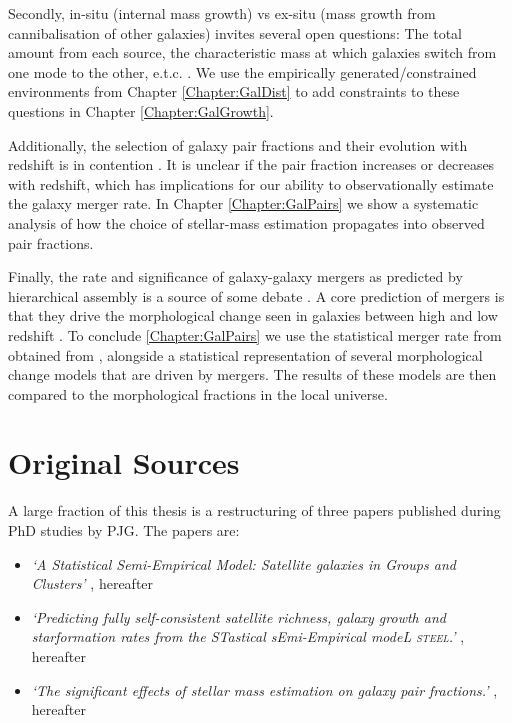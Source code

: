 Secondly, in-situ (internal mass growth) vs ex-situ (mass growth from cannibalisation of other galaxies) invites several open questions: The total amount from each source, the characteristic mass at which galaxies switch from one mode to the other, e.t.c.  \cite[e.g.]{Cattaneo2011HowMass, Moster2018Emerge10, Behroozi2019UniverseMachine:010, Bernardi2011Curvature1011M, Shankar2015}. We use the empirically generated/constrained environments from Chapter \ref{Chapter:GalDist} to add constraints to these questions in Chapter \ref{Chapter:GalGrowth}.

Additionally, the selection of galaxy pair fractions and their evolution with redshift is in contention \citet{Man2016RESOLVING03, Mundy2017A3.5}. It is unclear if the pair fraction increases or decreases with redshift, which has implications for our ability to observationally estimate the galaxy merger rate. In Chapter \ref{Chapter:GalPairs} we show a systematic analysis of how the choice of stellar-mass estimation propagates into observed pair fractions.

Finally, the rate and significance of galaxy-galaxy mergers as predicted by \LCDM hierarchical assembly is a source of some debate \cite[e.g.][]{Hopkins2010MERGERSMATTER,Hopkins2009HOWMERGERS,Hopkins2010MergersFunctions,Fensch2017High-redshiftFormation,Martin2017TheTime}. A core prediction of mergers is that they drive the morphological change seen in galaxies between high and low redshift \cite[e.g.][]{Bournaud2011HydrodynamicsSpheroids,Bournaud2011StarMergers,Hilz2013}. To conclude \ref{Chapter:GalPairs} we use the statistical merger rate from obtained from \steel, alongside a statistical representation of several morphological change models that are driven by mergers. The results of these models are then compared to the morphological fractions in the local universe.

\section{Original Sources}

A large fraction of this thesis is a restructuring of three papers published during PhD studies by PJG. The papers are:
\begin{itemize}
    \item \textit{`A Statistical Semi-Empirical Model: Satellite galaxies in Groups and Clusters'}  \citet{Grylls2019AClusters}, hereafter 
    \item \textit{`Predicting fully self-consistent satellite richness, galaxy growth and starformation rates from the STastical sEmi-Empirical modeL \textsc{steel}.'} \citet{Grylls2020PredictingSTEEL}, hereafter 
    \item \textit{`The significant effects of stellar mass estimation on galaxy pair fractions.'} \citet{Grylls2020TheFractions}, hereafter 
\end{itemize}

